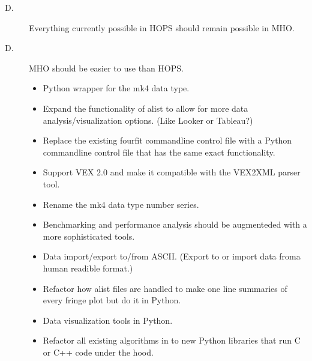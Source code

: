 \begin{description}
\item[D.\thereq] Everything currently possible in \ac{HOPS} should remain
possible in \ac{MHO}.
\item[D.\thereq] \ac{MHO} should be easier to use than \ac{HOPS}.

\begin{itemize}
\item Python wrapper for the mk4 data type.
\item Expand the functionality of alist to allow for more data analysis/visualization options. (Like Looker or Tableau?)
\item Replace the existing fourfit commandline control file with a Python commandline control file that has the same exact functionality.
\item Support VEX 2.0 and make it compatible with the VEX2XML parser tool.
\item Rename the mk4 data type number series.
\item Benchmarking and performance analysis should be augmenteded with a more sophisticated tools.
\item Data import/export to/from ASCII. (Export to or import data froma human readible format.)
\item Refactor how alist files are handled to make one line summaries of every fringe plot but do it in Python.
\item Data visualization tools in Python. %
\item Refactor all existing algorithms in to new Python libraries that run C or C++ code under the hood.
\end{itemize}

\end{description}

%
%
